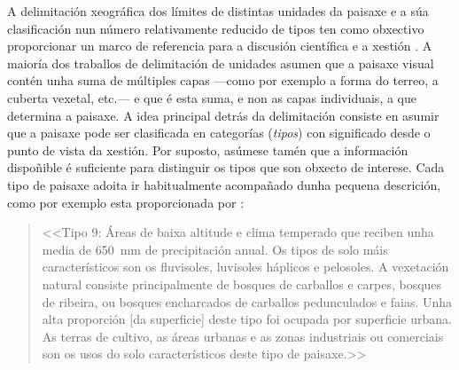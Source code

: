 \documentclass[11pt,a4paper]{article}
\begin{document}
A delimitación xeográfica dos límites de distintas unidades da paisaxe e a súa clasificación nun número relativamente reducido de tipos ten como obxectivo proporcionar un marco de referencia para a discusión científica e a xestión \citep{Brown2012317}. A maioría dos traballos de delimitación de unidades asumen que a paisaxe visual contén unha suma de múltiples capas ---como por exemplo a forma do terreo, a cuberta vexetal, etc.--- e que é esta suma, e non as capas individuais, a que determina a paisaxe. A idea principal detrás da delimitación consiste en asumir que a paisaxe pode ser clasificada en categorías (\emph{tipos}) con significado desde o punto de vista da xestión. Por suposto, asúmese tamén que a información dispoñible é suficiente para distinguir os tipos que son obxecto de interese. Cada tipo de paisaxe adoita ir habitualmente acompañado dunha pequena descrición, como por exemplo esta proporcionada por \citet{Chuman2010200}:
\begin{quote}
<<Tipo 9: Áreas de baixa altitude e clima temperado que reciben unha media de 650~mm de precipitación anual. Os tipos de solo máis característicos son os fluvisoles, luvisoles háplicos e pelosoles. A vexetación natural consiste principalmente de bosques de carballos e carpes, bosques de ribeira, ou bosques encharcados de carballos pedunculados e faias. Unha alta proporción [da superficie] deste tipo foi ocupada por superficie urbana. As terras de cultivo, as áreas urbanas e as zonas industriais ou comerciais son os usos do solo característicos deste tipo de paisaxe.>>
\end{quote}
\end{document}
